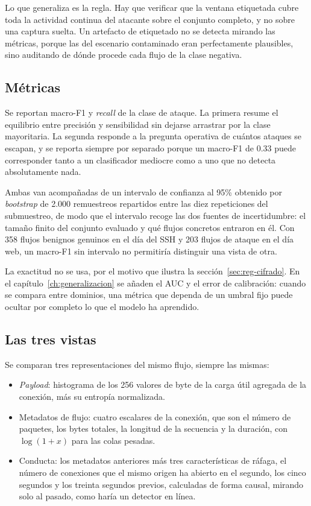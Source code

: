 Lo que generaliza es la regla. Hay que verificar que la ventana etiquetada cubre
toda la actividad continua del atacante sobre el conjunto completo, y no sobre
una captura suelta. Un artefacto de etiquetado no se detecta mirando las
métricas, porque las del escenario contaminado eran perfectamente plausibles,
sino auditando de dónde procede cada flujo de la clase negativa.

\subsection*{Métricas}

Se reportan macro-F1 y \emph{recall} de la clase de ataque. La primera resume el
equilibrio entre precisión y sensibilidad sin dejarse arrastrar por la clase
mayoritaria. La segunda responde a la pregunta operativa de cuántos ataques se
escapan, y se reporta siempre por separado porque un macro-F1 de $0.33$ puede
corresponder tanto a un clasificador mediocre como a uno que no detecta
absolutamente nada.

Ambas van acompañadas de un intervalo de confianza al 95\% obtenido por
\emph{bootstrap} de 2.000 remuestreos repartidos entre las diez repeticiones del
submuestreo, de modo que el intervalo recoge las dos fuentes de incertidumbre:
el tamaño finito del conjunto evaluado y qué flujos concretos entraron en él.
Con 358 flujos benignos genuinos en el día del SSH y 203 flujos de ataque en el
día web, un macro-F1 sin intervalo no permitiría distinguir una vista de otra.

La exactitud no se usa, por el motivo que ilustra la
sección~\ref{sec:reg-cifrado}. En el capítulo~\ref{ch:generalizacion} se añaden
el AUC y el error de calibración: cuando se compara entre dominios, una métrica
que dependa de un umbral fijo puede ocultar por completo lo que el modelo ha
aprendido.

\subsection*{Las tres vistas}

Se comparan tres representaciones del mismo flujo, siempre las mismas:

\begin{itemize}
  \item \emph{Payload}: histograma de los 256 valores de byte de la carga útil
        agregada de la conexión, más su entropía normalizada.
  \item Metadatos de flujo: cuatro escalares de la conexión, que son el número
        de paquetes, los bytes totales, la longitud de la secuencia y la
        duración, con $\log(1+x)$ para las colas pesadas.
  \item Conducta: los metadatos anteriores más tres características de ráfaga,
        el número de conexiones que el mismo origen ha abierto en el segundo,
        los cinco segundos y los treinta segundos previos, calculadas de forma
        causal, mirando solo al pasado, como haría un detector en línea.
\end{itemize}

